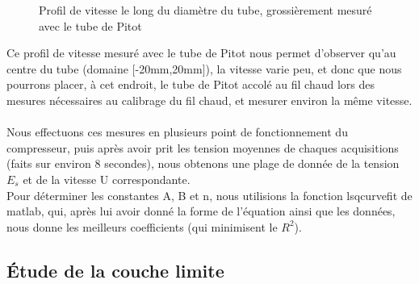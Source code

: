 \documentclass[12pt, a4paper]{report}
\begin{document}
	\begin{figure}[H] %
		\centering
		\caption{Profil de vitesse le long du diamètre du tube, grossièrement mesuré avec le tube de Pitot}
	\end{figure}
	Ce profil de vitesse mesuré avec le tube de Pitot nous permet d'observer qu'au centre du tube (domaine [-20mm,20mm]), la vitesse varie peu, et donc que nous pourrons placer, à cet endroit, le tube de Pitot accolé au fil chaud lors des mesures nécessaires au calibrage du fil chaud, et mesurer environ la même vitesse.\\\\
	Nous effectuons ces mesures en plusieurs point de fonctionnement du compresseur, puis après avoir prit les tension moyennes de chaques acquisitions (faits sur environ 8 secondes), nous obtenons une plage de donnée de la tension $E_s$ et de la vitesse U correspondante. \\
	Pour déterminer les constantes A, B et n, nous utilisions la fonction lsqcurvefit de matlab, qui, après lui avoir donné la forme de l'équation ainsi que les données, nous donne les meilleurs coefficients (qui minimisent le $R^2$).
	 
	
	\subsection{Étude de la couche limite}
	
\end{document}
